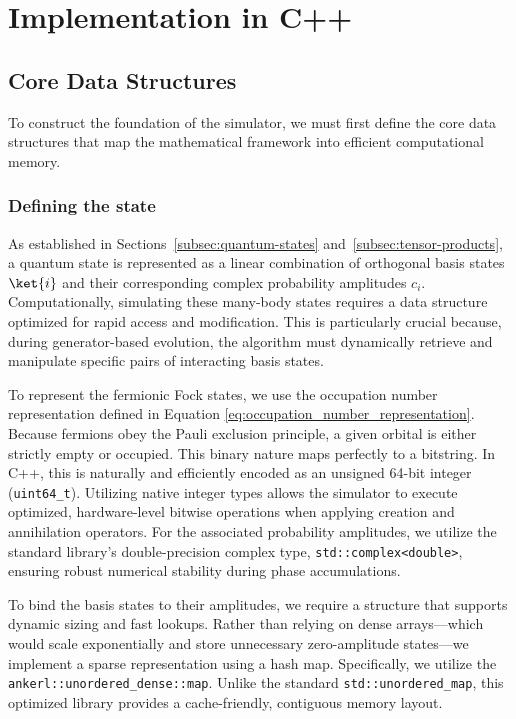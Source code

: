 \chapter{Implementation in C++}
\label{c:implementation}

\section{Core Data Structures}
To construct the foundation of the simulator, we must first define the core data structures that map the mathematical framework into efficient computational memory.

\subsection{Defining the state}
As established in Sections~\ref{subsec:quantum-states} and~\ref{subsec:tensor-products}, a quantum state is represented as a linear combination of orthogonal basis states $\ket{i}$ and their corresponding complex probability amplitudes $c_i$. Computationally, simulating these many-body states requires a data structure optimized for rapid access and modification. This is particularly crucial because, during generator-based evolution, the algorithm must dynamically retrieve and manipulate specific pairs of interacting basis states.

To represent the fermionic Fock states, we use the occupation number representation defined in Equation \eqref{eq:occupation_number_representation}. Because fermions obey the Pauli exclusion principle, a given orbital is either strictly empty or occupied. This binary nature maps perfectly to a bitstring. In C++, this is naturally and efficiently encoded as an unsigned 64-bit integer (\texttt{uint64\_t}). Utilizing native integer types allows the simulator to execute optimized, hardware-level bitwise operations when applying creation and annihilation operators. For the associated probability amplitudes, we utilize the standard library's double-precision complex type, \texttt{std::complex<double>}, ensuring robust numerical stability during phase accumulations.

To bind the basis states to their amplitudes, we require a structure that supports dynamic sizing and fast lookups. Rather than relying on dense arrays—which would scale exponentially and store unnecessary zero-amplitude states—we implement a sparse representation using a hash map. Specifically, we utilize the \texttt{ankerl::unordered\_dense::map}. Unlike the standard \texttt{std::unordered\_map}, this optimized library provides a cache-friendly, contiguous memory layout.

